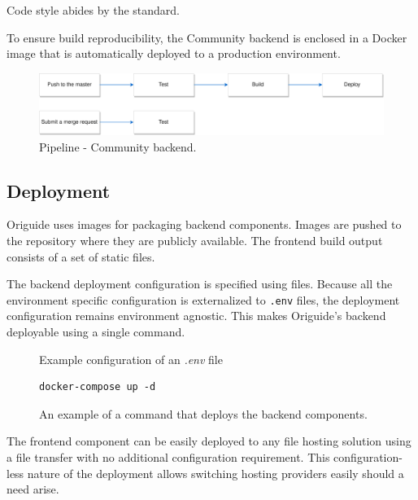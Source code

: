 \medskip
Code style abides by the  standard.

\medskip
To ensure build reproducibility, the Community backend is enclosed in a Docker image that is automatically deployed to a production environment. 

\begin{figure}[H]
  \caption{Pipeline - Community backend.}
  \centering
    \includegraphics[width=\textwidth]{assets/3-community-pipeline.png}
\end{figure}

\subsection{Deployment}

Origuide uses  images for packaging backend components. Images are pushed to the  repository where they are publicly available. The frontend build output consists of a set of static files.

\medskip
The backend deployment configuration is specified using  files. 
Because all the environment specific configuration is externalized to \texttt{.env} files, the deployment configuration remains environment agnostic. This makes Origuide's backend deployable using a single command.

\begin{figure}[H]
	\caption{Example configuration of an \textit{.env} file}
	
\end{figure}

\begin{figure}[H]
	\caption{An example of a command that deploys the backend components.}
	\begin{lstlisting}
docker-compose up -d
	\end{lstlisting}
\end{figure}

The frontend component can be easily deployed to any file hosting solution using a file transfer with no additional configuration requirement. This configuration-less nature of the deployment allows switching hosting providers easily should a need arise.

